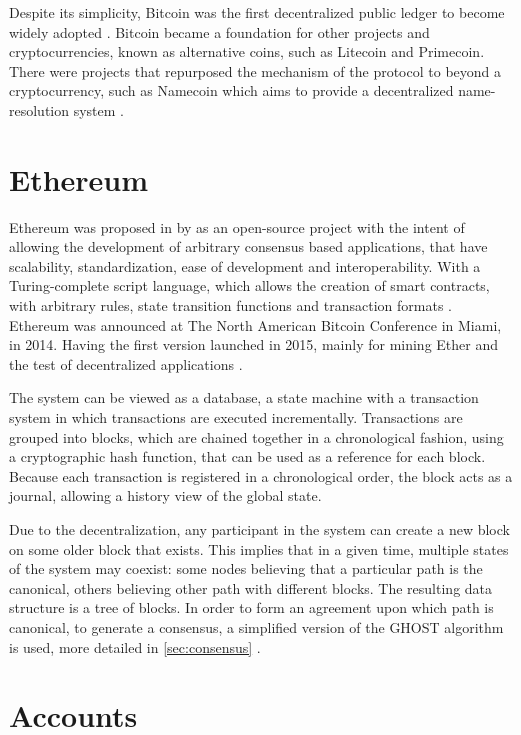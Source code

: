 \documentclass[
    article, 
    12pt,				%
	oneside,			%
	a4paper,			%
	chapter=TITLE,		%
	section=TITLE,		%
	english,			%
	english,				%
	sumario=tradicional
]{abntex2}
\begin{document}
Despite its simplicity, Bitcoin was the first decentralized public ledger to become widely adopted \cite{wood_ethereum_2021}.
Bitcoin became a foundation for other projects and cryptocurrencies, known as alternative coins, such as Litecoin and Primecoin.
There were projects that repurposed the mechanism of the protocol to beyond a cryptocurrency, such as Namecoin which aims to provide a decentralized name-resolution system \cite{wood_ethereum_2021}.  


\section{Ethereum}

Ethereum was proposed in \citeyear{buterin_eth_whitepaper_2013} by \citeauthor{buterin_eth_whitepaper_2013} as an open-source project with the intent of allowing the development of arbitrary consensus based applications, that have scalability, standardization, ease of development and interoperability. 
With a Turing-complete script language, which allows the creation of smart contracts, with arbitrary rules, state transition functions and transaction formats \cite{buterin_eth_whitepaper_2013}.
Ethereum was announced at The North American Bitcoin Conference in Miami, in 2014.
Having the first version launched in 2015, mainly for mining Ether and the test of decentralized applications \cite{eth_history_jianing_2021}. 

The system can be viewed as a database, a state machine with a transaction system in which transactions are executed incrementally.
Transactions are grouped into blocks, which are chained together in a chronological fashion, using a cryptographic hash function, that can be used as a reference for each block.
Because each transaction is registered in a chronological order, the block acts as a journal, allowing a history view of the global state.

Due to the decentralization, any participant in the system can create a new block on some older block that exists.
This implies that in a given time, multiple states of the system may coexist: some nodes believing that a particular path is the canonical, others believing other path with different blocks.
The resulting data structure is a tree of blocks. 
In order to form an agreement upon which path is canonical, to generate a consensus, a simplified version of the GHOST algorithm is used, more detailed in \autoref{sec:consensus} \cite{wood_ethereum_2021}.


\section{Accounts}
\end{document}
